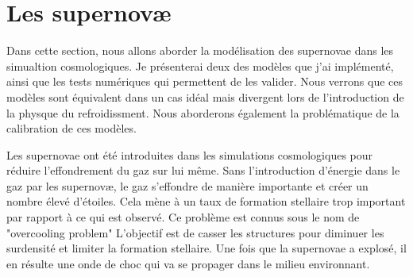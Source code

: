\clearpage
\section{Les supernovæ}

Dans cette section, nous allons aborder la modélisation des supernovae dans les simualtion cosmologiques.
Je présenterai deux des modèles que j'ai implémenté, ainsi que les tests numériques qui permettent de les valider.
Nous verrons que ces modèles sont équivalent dans un cas idéal mais divergent lors de l'introduction de la physque du refroidissment.
Nous aborderons également la problématique de la calibration de ces modèles.


Les supernovae ont été introduites dans les simulations cosmologiques pour réduire l'effondrement du gaz sur lui même.
Sans l'introduction d'énergie dans le gaz par les supernovæ, le gaz s'effondre de manière importante et créer un nombre élevé d'étoiles.
Cela mène à un taux de formation stellaire trop important par rapport à ce qui est observé.
Ce problème est connus sous le nom de "overcooling problem"
L'objectif est de casser les structures pour diminuer les surdensité et limiter la formation stellaire.
Une fois que la supernovae a explosé, il en résulte une onde de choc qui va se propager dans le milieu environnant.


%
%

